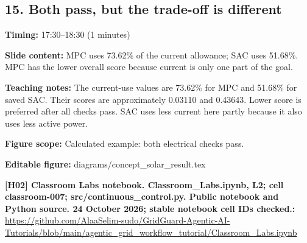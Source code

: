 \documentclass[10pt,letterpaper]{article}
\begin{document}
\subsection*{15. Both pass, but the trade-off is different}
\textbf{Timing:} 17:30--18:30 (1 minutes)\par
\textbf{Slide content:} MPC uses 73.62\% of the current allowance; SAC uses 51.68\%.
MPC has the lower overall score because current is only one part of the goal.\par
\textbf{Teaching notes:} The current-use values are 73.62\% for MPC and 51.68\% for saved SAC. Their scores are approximately 0.03110 and 0.43643. Lower score is preferred after all checks pass. SAC uses less current here partly because it also uses less active power.\par
\textbf{Figure scope:} Calculated example: both electrical checks pass.\par
\textbf{Editable figure:} diagrams/concept\_solar\_result.tex\par
\textbf{[H02] Classroom Labs notebook. Classroom\_Labs.ipynb, L2; cell classroom-007; src/continuous\_control.py. Public notebook and Python source. 24 October 2026; stable notebook cell IDs checked.:} \href{https://github.com/AlaaSelim-sudo/GridGuard-Agentic-AI-Tutorials/blob/main/agentic_grid_workflow_tutorial/Classroom_Labs.ipynb}{\small\ttfamily https:/\allowbreak{}/\allowbreak{}github.\allowbreak{}com/\allowbreak{}AlaaSelim-\allowbreak{}sudo/\allowbreak{}GridGuard-\allowbreak{}Agentic-\allowbreak{}AI-\allowbreak{}Tutorials/\allowbreak{}blob/\allowbreak{}main/\allowbreak{}agentic\_\allowbreak{}grid\_\allowbreak{}workflow\_\allowbreak{}tutorial/\allowbreak{}Classroom\_\allowbreak{}Labs.\allowbreak{}ipynb}\par
\par\medskip
\end{document}
